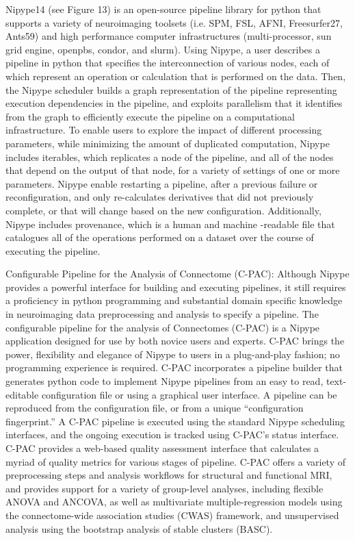 Nipype14 (see Figure 13) is an open-source pipeline library for python that supports a variety of neuroimaging toolsets (i.e. SPM, FSL, AFNI, Freesurfer27, Ants59) and high performance computer infrastructures (multi-processor, sun grid engine, openpbs, condor, and slurm). Using Nipype, a user describes a pipeline in python that specifies the interconnection of various nodes, each of which represent an operation or calculation that is performed on the data. Then, the Nipype scheduler builds a graph representation of the pipeline representing execution dependencies in the pipeline, and exploits parallelism that it identifies from the graph to efficiently execute the pipeline on a computational infrastructure. To enable users to explore the impact of different processing parameters, while minimizing the amount of duplicated computation, Nipype includes iterables, which replicates a node of the pipeline, and all of the nodes that depend on the output of that node, for a variety of settings of one or more parameters. Nipype enable restarting a pipeline, after a previous failure or reconfiguration, and only re-calculates derivatives that did not previously complete, or that will change based on the new configuration. Additionally, Nipype includes provenance, which is a human and machine -readable file that catalogues all of the operations performed on a dataset over the course of executing the pipeline.

Configurable Pipeline for the Analysis of Connectome (C-PAC): Although Nipype provides a powerful interface for building and executing pipelines, it still requires a proficiency in python programming and substantial domain specific knowledge in neuroimaging data preprocessing and analysis to specify a pipeline. The configurable pipeline for the analysis of Connectomes (C-PAC) is a Nipype application designed for use by both novice users and experts. C-PAC brings the power, flexibility and elegance of Nipype to users in a plug-and-play fashion; no programming experience is required. C-PAC incorporates a pipeline builder that generates python code to implement Nipype pipelines from an easy to read, text-editable configuration file or using a graphical user interface. A pipeline can be reproduced from the configuration file, or from a unique “configuration fingerprint.” A C-PAC pipeline is executed using the standard Nipype scheduling interfaces, and the ongoing execution is tracked using C-PAC’s status interface. C-PAC provides a web-based quality assessment interface that calculates a myriad of quality metrics for various stages of pipeline. C-PAC offers a variety of preprocessing steps and analysis workflows for structural and functional MRI, and provides support for a variety of group-level analyses, including flexible ANOVA and ANCOVA, as well as multivariate multiple-regression models using the connectome-wide association studies (CWAS) framework, and unsupervised analysis using the bootstrap analysis of stable clusters (BASC).

